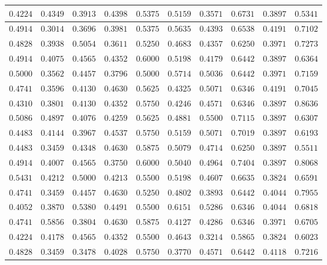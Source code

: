 \begin{longtable}{c|c|c|c|c|c|c|c|c|c}
$0.4224$ & $0.4349$ & $0.3913$ & $0.4398$ & $0.5375$ & $0.5159$ & $0.3571$ & $0.6731$ & $0.3897$ & $0.5341$ \\ \hline
$0.4914$ & $0.3014$ & $0.3696$ & $0.3981$ & $0.5375$ & $0.5635$ & $0.4393$ & $0.6538$ & $0.4191$ & $0.7102$ \\ \hline
$0.4828$ & $0.3938$ & $0.5054$ & $0.3611$ & $0.5250$ & $0.4683$ & $0.4357$ & $0.6250$ & $0.3971$ & $0.7273$ \\ \hline
$0.4914$ & $0.4075$ & $0.4565$ & $0.4352$ & $0.6000$ & $0.5198$ & $0.4179$ & $0.6442$ & $0.3897$ & $0.6364$ \\ \hline
$0.5000$ & $0.3562$ & $0.4457$ & $0.3796$ & $0.5000$ & $0.5714$ & $0.5036$ & $0.6442$ & $0.3971$ & $0.7159$ \\ \hline
$0.4741$ & $0.3596$ & $0.4130$ & $0.4630$ & $0.5625$ & $0.4325$ & $0.5071$ & $0.6346$ & $0.4191$ & $0.7045$ \\ \hline
$0.4310$ & $0.3801$ & $0.4130$ & $0.4352$ & $0.5750$ & $0.4246$ & $0.4571$ & $0.6346$ & $0.3897$ & $0.8636$ \\ \hline
$0.5086$ & $0.4897$ & $0.4076$ & $0.4259$ & $0.5625$ & $0.4881$ & $0.5500$ & $0.7115$ & $0.3897$ & $0.6307$ \\ \hline
$0.4483$ & $0.4144$ & $0.3967$ & $0.4537$ & $0.5750$ & $0.5159$ & $0.5071$ & $0.7019$ & $0.3897$ & $0.6193$ \\ \hline
$0.4483$ & $0.3459$ & $0.4348$ & $0.4630$ & $0.5875$ & $0.5079$ & $0.4714$ & $0.6250$ & $0.3897$ & $0.5511$ \\ \hline
$0.4914$ & $0.4007$ & $0.4565$ & $0.3750$ & $0.6000$ & $0.5040$ & $0.4964$ & $0.7404$ & $0.3897$ & $0.8068$ \\ \hline
$0.5431$ & $0.4212$ & $0.5000$ & $0.4213$ & $0.5500$ & $0.5198$ & $0.4607$ & $0.6635$ & $0.3824$ & $0.6591$ \\ \hline
$0.4741$ & $0.3459$ & $0.4457$ & $0.4630$ & $0.5250$ & $0.4802$ & $0.3893$ & $0.6442$ & $0.4044$ & $0.7955$ \\ \hline
$0.4052$ & $0.3870$ & $0.5380$ & $0.4491$ & $0.5500$ & $0.6151$ & $0.5286$ & $0.6346$ & $0.4044$ & $0.6818$ \\ \hline
$0.4741$ & $0.5856$ & $0.3804$ & $0.4630$ & $0.5875$ & $0.4127$ & $0.4286$ & $0.6346$ & $0.3971$ & $0.6705$ \\ \hline
$0.4224$ & $0.4178$ & $0.4565$ & $0.4352$ & $0.5500$ & $0.4643$ & $0.3214$ & $0.5865$ & $0.3824$ & $0.6023$ \\ \hline
$0.4828$ & $0.3459$ & $0.3478$ & $0.4028$ & $0.5750$ & $0.3770$ & $0.4571$ & $0.6442$ & $0.4118$ & $0.7216$ \\ \hline

\end{longtable}

